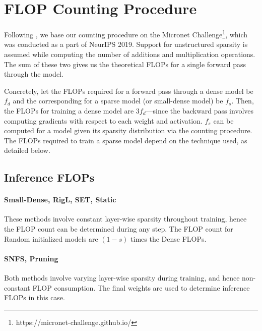 \section{FLOP Counting Procedure}

Following \citet{rigl}, we base our counting procedure on the Micronet Challenge\footnote{https://micronet-challenge.github.io/}, which was conducted as a part of NeurIPS 2019. Support for unstructured sparsity is assumed while computing the number of additions and multiplication operations. The sum of these two gives us the theoretical FLOPs for a single forward pass through the model. 

Concretely, let the FLOPs required for a forward pass through a dense model be $f_d$ and the corresponding for a sparse model (or small-dense model) be $f_s$. Then, the FLOPs for training a dense model are $3f_d$---since the backward pass involves computing gradients with respect to each weight and activation. $f_s$ can be computed for a model given its sparsity distribution via the counting procedure. The FLOPs required to train a sparse model depend on the technique used, as detailed below.


\subsection{Inference FLOPs}


\paragraph{Small-Dense, RigL, SET, Static} These methods involve constant layer-wise sparsity throughout training, hence the FLOP count can be determined during any step. The FLOP count for Random initialized models are $(1-s)$ times the Dense FLOPs.

\paragraph{SNFS, Pruning} Both methods involve varying layer-wise sparsity during training, and hence non-constant FLOP consumption. The final weights are used to determine inference FLOPs in this case.

